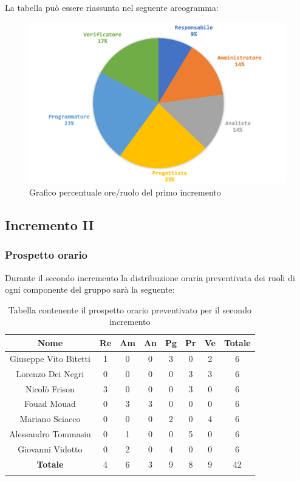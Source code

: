 		La tabella può essere riassunta nel seguente areogramma:
		\begin{figure}[H]
			\centering
			\includegraphics[width=0.8\linewidth]{./images/preventivo/incremento1-2.png}
			\caption{Grafico percentuale ore/ruolo del primo incremento}
			\label{fig:grafico costi ruolo incremento I}
		\end{figure}
	
	
	
	\subsection{Incremento II}
		\subsubsection{Prospetto orario}
		Durante il secondo incremento la distribuzione oraria preventivata dei ruoli di ogni componente del gruppo sarà la seguente:
		
		\begin{longtable}{|c|c|c|c|c|c|c|c|}
			\hline
			\rowcolor{lighter-grayer}
			\textbf{Nome} & \textbf{Re} & \textbf{Am} & \textbf{An} & \textbf{Pg}  & \textbf{Pr}   & \textbf{Ve} & \textbf{Totale} \\
			\hline
			\endfirsthead
			
			\hline
			Giuseppe Vito Bitetti 		 & 1 & 0 & 0 & 3 & 0 & 2 & 6\\
			\hline
			\hline
			Lorenzo Dei Negri			 & 0 & 0 & 0 & 0 & 3 & 3 & 6\\
			\hline
			\hline
			Nicolò Frison				      & 3 & 0 & 0 & 0 & 3 & 0 & 6\\
			\hline
			\hline
			Fouad Mouad 				   & 0 & 3 & 3 & 0 & 0 & 0 & 6\\
			\hline
			\hline
			Mariano Sciacco 			 & 0 & 0 & 0 & 2 & 0 & 4 & 6\\
			\hline
			\hline
			Alessandro Tommasin    & 0 & 1 & 0 & 0 & 5 & 0 & 6\\
			\hline
			\hline
			Giovanni Vidotto 			 & 0 & 2 & 0 & 4 & 0 & 0 & 6\\
			\hline 
			\textbf{Totale}			 		& 4 & 6 & 3 & 9 & 8 & 9 & 42\\
			\hline
			\caption{Tabella contenente il prospetto orario preventivato per il secondo incremento}
		\end{longtable}
		\pagebreak
		
